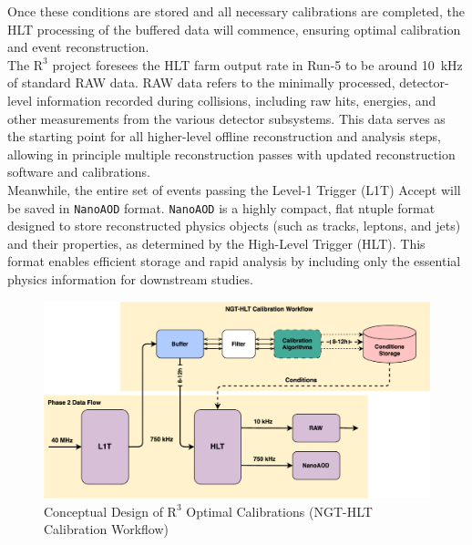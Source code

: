 Once these conditions are stored and all necessary calibrations are completed, the HLT processing of the buffered data will commence, ensuring optimal calibration and event reconstruction. \\
The $\mathrm{R}^3$ project foresees the HLT farm output rate in Run-\num{5} to be around \SI{10}{\kilo\hertz} of standard RAW data. RAW data refers to the minimally processed, detector-level information recorded during collisions, including raw hits, energies, and other measurements from the various detector subsystems. This data serves as the starting point for all higher-level offline reconstruction and analysis steps, allowing in principle multiple reconstruction passes with updated reconstruction software and calibrations.\\ Meanwhile, the entire set of events passing the Level-1 Trigger (L1T) Accept will be saved in \texttt{NanoAOD} format. \texttt{NanoAOD} is a highly compact, flat ntuple format designed to store reconstructed physics objects (such as tracks, leptons, and jets) and their properties, as determined by the High-Level Trigger (HLT). This format enables efficient storage and rapid analysis by including only the essential physics information for downstream studies.


\begin{figure}[h!]	
\centering
\includegraphics[width=\textwidth]{figures/NGT_Calibration_Workflow_updated.pdf}
\caption{Conceptual Design of $\mathrm{R}^{3}$ Optimal Calibrations (NGT-HLT Calibration Workflow)}
\label{fig:NGT-HLT_CalibrationWorkflow}
\end{figure}

